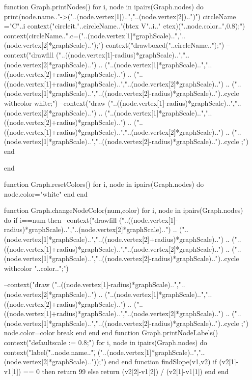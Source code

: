 function Graph.printNodes()
	for i, node in ipairs(Graph.nodes) do
		print(node.name.."->("..(node.vertex[1])..","..(node.vertex[2])..")")
		circleName ="C"..i
		context("circleit."..circleName.."(btex V"..i.." etex)("..node.color..",0.8);")
		context(circleName..".c=("..(node.vertex[1]*graphScale)..","..(node.vertex[2]*graphScale)..");")
		context("drawboxed("..circleName..");")
		--context("drawfill ("..((node.vertex[1]-radius)*graphScale)..","..(node.vertex[2]*graphScale)..") .. ("..(node.vertex[1]*graphScale)..","..((node.vertex[2]+radius)*graphScale)..") .. ("..((node.vertex[1]+radius)*graphScale)..","..(node.vertex[2]*graphScale)..") .. ("..(node.vertex[1]*graphScale)..","..((node.vertex[2]-radius)*graphScale)..")..cycle withcolor white;")
		--context("draw ("..((node.vertex[1]-radius)*graphScale)..","..(node.vertex[2]*graphScale)..") .. ("..(node.vertex[1]*graphScale)..","..((node.vertex[2]+radius)*graphScale)..") .. ("..((node.vertex[1]+radius)*graphScale)..","..(node.vertex[2]*graphScale)..") .. ("..(node.vertex[1]*graphScale)..","..((node.vertex[2]-radius)*graphScale)..")..cycle ;")
	end

end

function Graph.resetColors()
	for i, node in ipairs(Graph.nodes) do
		node.color="white"
	end
end


function Graph.changeNodeColor(num,color)
	for i, node in ipairs(Graph.nodes) do
		if i==num then			
			--context("drawfill ("..((node.vertex[1]-radius)*graphScale)..","..(node.vertex[2]*graphScale)..") .. ("..(node.vertex[1]*graphScale)..","..((node.vertex[2]+radius)*graphScale)..") .. ("..((node.vertex[1]+radius)*graphScale)..","..(node.vertex[2]*graphScale)..") .. ("..(node.vertex[1]*graphScale)..","..((node.vertex[2]-radius)*graphScale)..")..cycle withcolor "..color..";")
		
			--context("draw ("..((node.vertex[1]-radius)*graphScale)..","..(node.vertex[2]*graphScale)..") .. ("..(node.vertex[1]*graphScale)..","..((node.vertex[2]+radius)*graphScale)..") .. ("..((node.vertex[1]+radius)*graphScale)..","..(node.vertex[2]*graphScale)..") .. ("..(node.vertex[1]*graphScale)..","..((node.vertex[2]-radius)*graphScale)..")..cycle ;")
			node.color=color
			break		
		end
	end
end
function Graph.printNodeLabels()
	context("defaultscale := 0.8;")
	for i, node in ipairs(Graph.nodes) do
			context("label(\""..node.name.."\", ("..(node.vertex[1]*graphScale)..","..(node.vertex[2]*graphScale).."));")
	end
end
function findSlope(v1,v2)
	if (v2[1]-v1[1]) == 0 then
		return 99
	else
		return (v2[2]-v1[2])  / (v2[1]-v1[1])
	end
end


